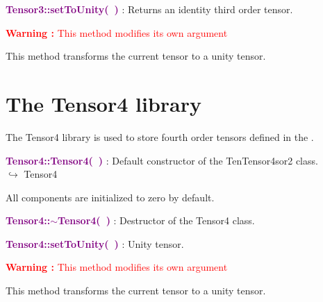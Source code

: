 
\textcolor{purple}{\textbf{Tensor3::setToUnity(~)}}\label{Tensor3::setToUnity()} : Returns an identity third order tensor.

\hspace*{10mm}\textcolor{red}{\textbf{Warning :} This method modifies its own argument}

This method transforms the current tensor to a unity tensor.

\section{The Tensor4 library}

The Tensor4 library is used to store fourth order tensors defined in the \DynELA.

\textcolor{purple}{\textbf{Tensor4::Tensor4(~)}}\label{Tensor4::Tensor4()} : Default constructor of the TenTensor4sor2 class.\\ \hspace*{5mm}$\hookrightarrow$ Tensor4

All components are initialized to zero by default.

\textcolor{purple}{\textbf{Tensor4::$\sim$Tensor4(~)}}\label{Tensor4::~Tensor4()} : Destructor of the Tensor4 class.


\textcolor{purple}{\textbf{Tensor4::setToUnity(~)}}\label{Tensor4::setToUnity()} : Unity tensor.

\hspace*{10mm}\textcolor{red}{\textbf{Warning :} This method modifies its own argument}

This method transforms the current tensor to a unity tensor.
